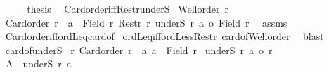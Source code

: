 \begin{isabellebody}
\ \ \isamarkupfalse%
\ \isamarkupfalse%
\ {\isacharquery}{\kern0pt}thesis\ \isacommand{{\isachardot}{\kern0pt}}\isamarkupfalse%
\isanewline
{}\isamarkupfalse%
%
\endisatagproof
{\isafoldproof}%
%
\isadelimproof
\isanewline
%
\endisadelimproof
\isanewline
{}\isamarkupfalse%
\ Card{\isacharunderscore}{\kern0pt}order{\isacharunderscore}{\kern0pt}iff{\isacharunderscore}{\kern0pt}Restr{\isacharunderscore}{\kern0pt}underS{\isacharcolon}{\kern0pt}\isanewline
{}\ {\isachardoublequoteopen}Well{\isacharunderscore}{\kern0pt}order\ r{\isachardoublequoteclose}\isanewline
{}\ {\isachardoublequoteopen}Card{\isacharunderscore}{\kern0pt}order\ r\ {\isacharequal}{\kern0pt}\ {\isacharparenleft}{\kern0pt}{\isasymforall}a\ {\isasymin}\ Field\ r{\isachardot}{\kern0pt}\ Restr\ r\ {\isacharparenleft}{\kern0pt}underS\ r\ a{\isacharparenright}{\kern0pt}\ {\isacharless}{\kern0pt}o\ {\isacharbar}{\kern0pt}Field\ r{\isacharbar}{\kern0pt}\ {\isacharparenright}{\kern0pt}{\isachardoublequoteclose}\isanewline
%
\isadelimproof
%
\endisadelimproof
%
\isatagproof
{}\isamarkupfalse%
\ assms\ \isamarkupfalse%
\ Card{\isacharunderscore}{\kern0pt}order{\isacharunderscore}{\kern0pt}iff{\isacharunderscore}{\kern0pt}ordLeq{\isacharunderscore}{\kern0pt}card{\isacharunderscore}{\kern0pt}of\isanewline
{}\isamarkupfalse%
\ ordLeq{\isacharunderscore}{\kern0pt}iff{\isacharunderscore}{\kern0pt}ordLess{\isacharunderscore}{\kern0pt}Restr\ card{\isacharunderscore}{\kern0pt}of{\isacharunderscore}{\kern0pt}Well{\isacharunderscore}{\kern0pt}order\ \isamarkupfalse%
\ blast%
\endisatagproof
{\isafoldproof}%
%
\isadelimproof
\isanewline
%
\endisadelimproof
\isanewline
{}\isamarkupfalse%
\ card{\isacharunderscore}{\kern0pt}of{\isacharunderscore}{\kern0pt}underS{\isacharcolon}{\kern0pt}\isanewline
{}\ r{\isacharcolon}{\kern0pt}\ {\isachardoublequoteopen}Card{\isacharunderscore}{\kern0pt}order\ r{\isachardoublequoteclose}\ \ a{\isacharcolon}{\kern0pt}\ {\isachardoublequoteopen}a\ {\isasymin}\ Field\ r{\isachardoublequoteclose}\isanewline
{}\ {\isachardoublequoteopen}{\isacharbar}{\kern0pt}underS\ r\ a{\isacharbar}{\kern0pt}\ {\isacharless}{\kern0pt}o\ r{\isachardoublequoteclose}\isanewline
%
\isadelimproof
%
\endisadelimproof
%
\isatagproof
{}\isamarkupfalse%
{\isacharminus}{\kern0pt}\isanewline
\ \ \isamarkupfalse%
\ {\isacharquery}{\kern0pt}A\ {\isacharequal}{\kern0pt}\ {\isachardoublequoteopen}underS\ r\ a{\isachardoublequoteclose}\ \ \isamarkupfalse%

\end{isabellebody}

